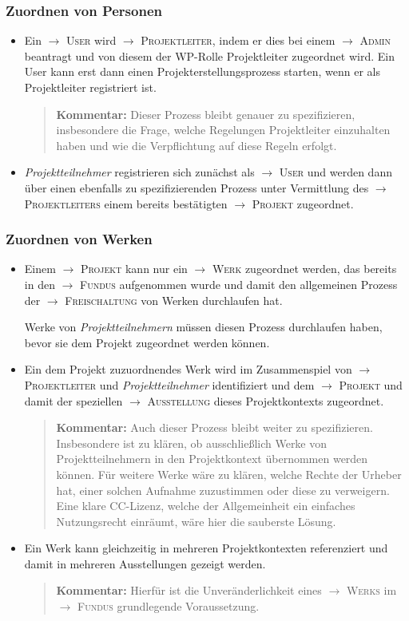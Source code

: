 \documentclass[a4paper,11pt]{article}
\newcommand{\Kommentar}[1]{
  \begin{quote}\textbf{Kommentar:} #1 \end{quote}
}
\newcommand{\glossar}[1]{{$\to$ \textsc{#1}}}
\begin{document}
\subsubsection*{Zuordnen von Personen}

\begin{itemize}
\item Ein \glossar{User} wird \glossar{Projektleiter}, indem er dies bei einem
  \glossar{Admin} beantragt und von diesem der WP-Rolle Projektleiter
  zugeordnet wird.  Ein User kann erst dann einen Projekterstellungsprozess
  starten, wenn er als Projektleiter registriert ist.

  \Kommentar{Dieser Prozess bleibt genauer zu spezifizieren, insbesondere die
    Frage, welche Regelungen Projektleiter einzuhalten haben und wie die
    Verpflichtung auf diese Regeln erfolgt.}

\item \emph{Projektteilnehmer} registrieren sich zunächst als \glossar{User}
  und werden dann über einen ebenfalls zu spezifizierenden Prozess unter
  Vermittlung des \glossar{Projektleiters} einem bereits bestätigten
  \glossar{Projekt} zugeordnet.
\end{itemize}

\subsubsection*{Zuordnen von Werken}

\begin{itemize}
\item Einem \glossar{Projekt} kann nur ein \glossar{Werk} zugeordnet werden,
  das bereits in den \glossar{Fundus} aufgenommen wurde und damit den
  allgemeinen Prozess der \glossar{Freischaltung} von Werken durchlaufen hat.

  Werke von \emph{Projektteilnehmern} müssen diesen Prozess durchlaufen haben,
  bevor sie dem Projekt zugeordnet werden können.

\item Ein dem Projekt zuzuordnendes Werk wird im Zusammenspiel von
  \glossar{Projektleiter} und \emph{Projektteilnehmer} identifiziert und dem
  \glossar{Projekt} und damit der speziellen \glossar{Ausstellung} dieses
  Projektkontexts zugeordnet.

\Kommentar{Auch dieser Prozess bleibt weiter zu spezifizieren.  Insbesondere
  ist zu klären, ob ausschließlich Werke von Projektteilnehmern in den
  Projektkontext übernommen werden können.  Für weitere Werke wäre zu klären,
  welche Rechte der Urheber hat, einer solchen Aufnahme zuzustimmen oder diese
  zu verweigern. Eine klare CC-Lizenz, welche der Allgemeinheit ein einfaches
  Nutzungsrecht einräumt, wäre hier die sauberste Lösung.}

\item Ein Werk kann gleichzeitig in mehreren Projektkontexten referenziert und
  damit in mehreren Ausstellungen gezeigt werden.

\Kommentar{Hierfür ist die Unveränderlichkeit eines \glossar{Werks} im
  \glossar{Fundus} grundlegende Voraussetzung. }
\end{itemize}
\end{document}
